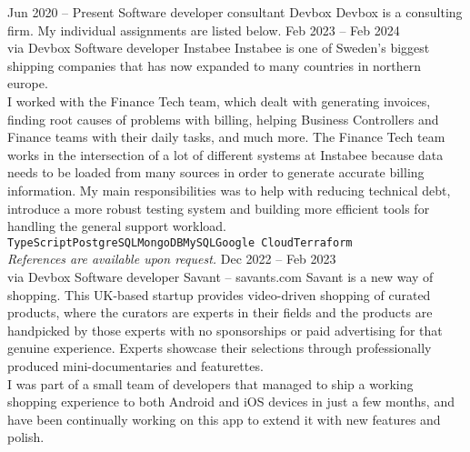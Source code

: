 \documentclass[9pt]{developercv} %
\begin{document}

\pagebreak
{}

\begin{entrylist}
  \entry
    {Jun 2020 -- Present}
    {Software developer consultant}
    {Devbox}
    {Devbox is a consulting firm. My individual assignments are listed below.}
  \entry
    {Feb 2023 -- Feb 2024\\\footnotesize{via Devbox}}
    {Software developer}
    {Instabee}
    {Instabee is one of Sweden's biggest shipping companies that has now
    expanded to many countries in northern europe.\\
    I worked with the Finance Tech team, which dealt with generating invoices,
    finding root causes of problems with billing, helping Business Controllers
    and Finance teams with their daily tasks, and much more. The Finance Tech
    team works in the intersection of a lot of different systems at Instabee
    because data needs to be loaded from many sources in order to generate
    accurate billing information. My main responsibilities was to help with
    reducing technical debt, introduce a more robust testing system and
    building more efficient tools for handling the general support workload.\\
    \texttt{TypeScript}\slashsep\texttt{PostgreSQL}\slashsep\texttt{MongoDB}\slashsep\texttt{MySQL}\slashsep\texttt{Google
    Cloud}\slashsep\texttt{Terraform}\\
    \textit{References are available upon request.}
    }
  \entry
    {Dec 2022 -- Feb 2023\\\footnotesize{via Devbox}}
    {Software developer}
    {Savant -- savants.com}
    {Savant is a new way of shopping. This UK-based startup provides
    video-driven shopping of curated products, where the curators are experts
    in their fields and the products are handpicked by those experts with no
    sponsorships or paid advertising for that genuine experience. Experts
    showcase their selections through professionally produced
    mini-documentaries and featurettes.\\
    I was part of a small team of developers that managed to ship a working
    shopping experience to both Android and iOS devices in just a few months,
    and have been continually working on this app to extend it with new
    features and polish.\\
}
\end{entrylist}
\end{document}
